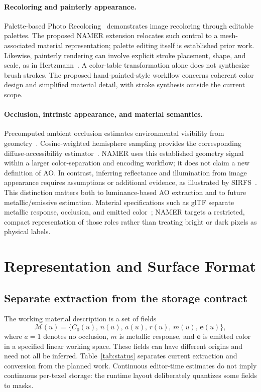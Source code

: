 \documentclass[11pt,letterpaper]{article}
\begin{document}
\paragraph{Recoloring and painterly appearance.}
Palette-based Photo Recoloring~\cite{chang2015} demonstrates image recoloring through editable palettes. The proposed NAMER extension relocates such control to a mesh-associated material representation; palette editing itself is established prior work. Likewise, painterly rendering can involve explicit stroke placement, shape, and scale, as in Hertzmann~\cite{hertzmann1998}. A color-table transformation alone does not synthesize brush strokes. The proposed hand-painted-style workflow concerns coherent color design and simplified material detail, with stroke synthesis outside the current scope.


\paragraph{Occlusion, intrinsic appearance, and material semantics.}
Precomputed ambient occlusion estimates environmental visibility from geometry~\cite{pharr2004ao}. Cosine-weighted hemisphere sampling provides the corresponding diffuse-accessibility estimator~\cite{pbrt2023sampling}. NAMER uses this established geometry signal within a larger color-separation and encoding workflow; it does not claim a new definition of AO. In contrast, inferring reflectance and illumination from image appearance requires assumptions or additional evidence, as illustrated by SIRFS~\cite{barron2015}. This distinction matters both to luminance-based AO extraction and to future metallic/emissive estimation. Material specifications such as glTF separate metallic response, occlusion, and emitted color~\cite{gltf2}; NAMER targets a restricted, compact representation of those roles rather than treating bright or dark pixels as physical labels.

\section{Representation and Surface Format}

\subsection{Separate extraction from the storage contract}
The working material description is a set of fields
\begin{equation}
\mathcal M(u)=\{C_0(u),\,n(u),\,a(u),\,r(u),\,m(u),\,\mathbf e(u)\},
\label{eq:materialfields}
\end{equation}
where $a=1$ denotes no occlusion, $m$ is metallic response, and $\mathbf e$ is emitted color in a specified linear working space. These fields can have different origins and need not all be inferred. Table~\ref{tab:status} separates current extraction and conversion from the planned work. Continuous editor-time estimates do not imply continuous per-texel storage: the runtime layout deliberately quantizes some fields to masks.
\end{document}

